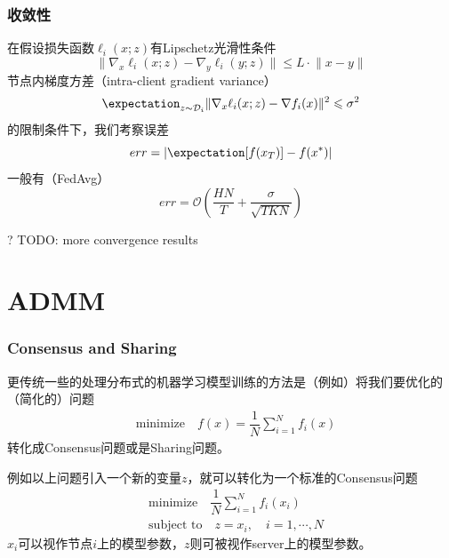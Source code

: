 
\begin{frame}
\frametitle{收敛性}

在假设损失函数$\ell_i(x;z)$有Lipschetz光滑性条件
$$\lVert \nabla_x \ell_i(x;z) - \nabla_y \ell_i(y;z) \rVert \leqslant L \cdot \lVert x-y \rVert$$
节点内梯度方差（intra-client gradient variance）
$$\expectation_{z \sim \mathcal{D}_i} \lVert \nabla_x \ell_i(x;z) - \nabla f_i(x) \rVert^2 \leqslant \sigma^2$$
的限制条件下，我们考察误差
$$err = | \expectation [f(x_T)] - f(x^*) |$$
一般有（FedAvg）
$$err = \mathcal{O} \left( \dfrac{HN}{T} + \dfrac{\sigma}{\sqrt{TKN}} \right)$$

{\color{red} \scriptsize ? TODO: more convergence results}

\end{frame}


\section{ADMM}  %


\begin{frame}
\frametitle{Consensus and Sharing}

更传统一些的处理分布式的机器学习模型训练的方法是（例如\cite{boyd2011distributed}）将我们要优化的（简化的）问题
\begin{align*}
    & \text{minimize} \quad f(x) = \dfrac{1}{N} \sum\limits_{i=1}^N f_i(x)
\end{align*}
转化成Consensus问题或是Sharing问题。

\pause
\vspace{0.8em}

例如以上问题引入一个新的变量$z$，就可以转化为一个标准的Consensus问题
\begin{align*}
    & \text{minimize} \quad \dfrac{1}{N} \sum\limits_{i=1}^N f_i(x_i) \\
    & \text{subject to} \quad z = x_i, \quad i=1,\cdots,N
\end{align*}
$x_i$可以视作节点$i$上的模型参数，$z$则可被视作server上的模型参数。

\end{frame}

